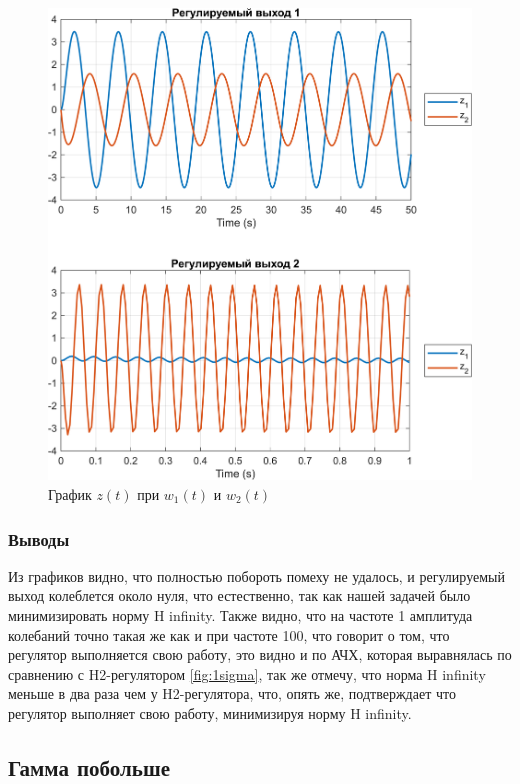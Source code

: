 \begin{figure}[H]
    \centering
    \includegraphics[width=1\linewidth]{figs/5_sim.png}
    \caption{График $z(t)$ при $w_1(t)$ и $w_2(t)$}
    \label{fig:5sim}
\end{figure}

\subsubsection{Выводы}

Из графиков видно, что полностью побороть помеху не удалось, и регулируемый выход 
колеблется около нуля, что естественно, так как нашей задачей было минимизировать норму H infinity. 
Также видно, что на частоте 1 амплитуда колебаний точно такая же как и при частоте 100,
что говорит о том, что регулятор выполняется свою работу, это видно и по АЧХ, которая
выравнялась по сравнению с H2-регулятором \autoref{fig:1sigma}, так же отмечу, что
норма H infinity меньше в два раза чем у H2-регулятора, что, опять же, подтверждает
что регулятор выполняет свою работу, минимизируя норму H infinity.



\subsection{Гамма побольше}

